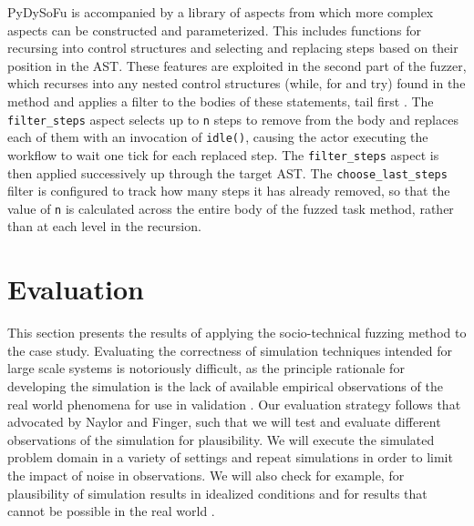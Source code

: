 \documentclass{llncs}
\begin{document}
PyDySoFu is accompanied by a library of aspects from which more complex aspects can be constructed and parameterized.
This includes functions for recursing into control structures and selecting and replacing steps based on their position
in the AST.  These features are exploited in the second part of the fuzzer, which recurses into any nested control
structures (while, for and try) found in the method and applies a filter to the bodies of these statements, tail first .
The \lstinline!filter_steps! aspect selects up to \lstinline!n! steps to remove from the body and replaces each of them
with an invocation of \lstinline!idle()!, causing the actor executing the workflow to wait one tick for each replaced
step.  The \lstinline!filter_steps! aspect is then applied successively up through the target AST.  The
\lstinline!choose_last_steps! filter is configured to track how many steps it has already removed, so that the value of
\lstinline!n! is calculated across the entire body of the fuzzed task method, rather than at each level in the
recursion.
 

\section{Evaluation}
\label{sec:evaluation}


This section presents the results of applying the socio-technical fuzzing method to the case study.  Evaluating the
correctness of simulation techniques intended for large scale systems is notoriously difficult, as the principle
rationale for developing the simulation is the lack of available empirical observations of the real world phenomena for
use in validation \citet{naylor67verification}.  Our evaluation strategy follows that advocated by Naylor and Finger,
such that we will test and evaluate different observations of the simulation for plausibility.  We will execute the
simulated problem domain in a variety of settings and repeat simulations in order to limit the impact of noise in
observations.  We will also check for example, for plausibility of simulation results in idealized conditions
\cite{shull11assuring} and for results that cannot be possible in the real world \cite{weyuker82testing}.
\end{document}
